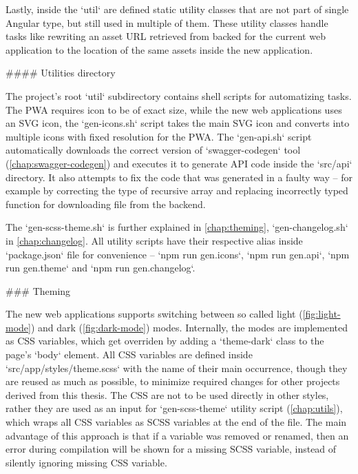 \documentclass[
  digital, %
  oneside, %
  lof,     %
  lot,     %
]{fithesis4}
\begin{document}
{Lastly, inside the `util` are defined static utility classes that are not part of single Angular type, but still used in multiple of them. These utility classes handle tasks like rewriting an asset URL retrieved from backed for the current web application to the location of the same assets inside the new application.

#### Utilities directory
\label{chap:utils}

The project's root `util` subdirectory contains shell scripts for automatizing tasks. The PWA requires icon to be of exact size, while the new web applications uses an SVG icon, the `gen-icons.sh` script takes the main SVG icon and converts into multiple icons with fixed resolution for the PWA. The `gen-api.sh` script automatically downloads the correct version of `swagger-codegen` tool (\autoref{chap:swagger-codegen}) and executes it to generate API code inside the `src/api` directory. It also attempts to fix the code that was generated in a faulty way -- for example by correcting the type of recursive array and replacing incorrectly typed function for downloading file from the backend.

The `gen-scss-theme.sh` is further explained in \autoref{chap:theming}, `gen-changelog.sh` in \autoref{chap:changelog}. All utility scripts have their respective alias inside `package.json` file for convenience -- `npm run gen.icons`, `npm run gen.api`, `npm run gen.theme` and `npm run gen.changelog`. 

### Theming
\label{chap:theming}

The new web applications supports switching between so called light (\autoref{fig:light-mode}) and dark (\autoref{fig:dark-mode}) modes. Internally, the modes are implemented as CSS variables, which get overriden by adding a `theme-dark` class to the page's `body` element. All CSS variables are defined inside `src/app/styles/theme.scss` with the name of their main occurrence, though they are reused as much as possible, to minimize required changes for other projects derived from this thesis. The CSS are not to be used directly in other styles, rather they are used as an input for `gen-scss-theme` utility script (\autoref{chap:utils}), which wraps all CSS variables as SCSS variables at the end of the file. The main advantage of this approach is that if a variable was removed or renamed, then an error during compilation will be shown for a missing SCSS variable, instead of silently ignoring missing CSS variable.

}
\end{document}
